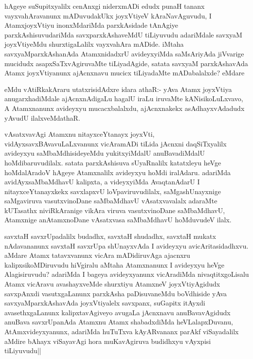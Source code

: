 \begin{artha}
hAgeye suSupitxyalilx cenAnxgi niderxmADi edudx punaH tananx vayxvahAravanunx mADuvudakUkx joyxVtiyeV kAraNavAguvudu, I AtamxjoyxVtiyu inonxMdariMda parxkAsidade tAnAgiye parxkAshisuvudariMda savxparxkAshaveMdU tiLiyuvudu adariMdale savxyaM joyxVtiyeMdu shurxtigaLalilx vayxvahAra mADide. iMtaha savxyaMparxkAshanAda AtamxnidadxrU avideyxyiMda saMsAriyAda jiVvarige mucidudx asapxSaTxvAgiruvaMte tiLiyadAgide, satata savxyaM parxkAshavAda Atamx joyxVtiyanunx ajAcnxnavu mucicx tiLiyadaMte mADabalalxde? eMdare  \stext 

eMdu vAtiRkakAraru utatxrisidAdxre idara athaR:- yAva Atamx joyxVtiya anugarxhadiMdale ajAcnxnAdigaLu hagalU iraLu iruvaMte kANisikoLuLxvavo, A Atamxnanunx avideyxyu mucacxbalalxdu, ajAcnxnakekx asAdhayxvAdadudx yAvudU ilalxveMdathaR.
\end{artha}


\begin{artha}
vAsatxvavAgi Atamxnu nitayxceYtanayx joyxVti, vidAyxsavxBAvavuLaLxvanunx vicAramADi tiLida jAcnxni daqSiTxyalilx avideyxyu saMbaMdhisideyeMdu yukitxyiMdalU anuBavadiMdalU hoMdibaruvudilalx. satata parxkAshisuva sUyaRnalilx katatxleyu heVge hoMdalAradoV hAgeye Atamxnalilx avideyxyu hoMdi iralAdaru. adariMda avidAyxsaMbaMdhavU kalipxta, a videyxyiMda AvaqtanAdarU I nitayxceYtanayxkekx savxlapxvU loVpaviruvudilalx, saMgashUnayxnige saMgaviruva vasutxvinoDane saMbaMdhavU vAsatxvavalalx adaraMte kUTasathx niviRkAranige vikAra viruva vasutxvinoDane saMbaMdhavU, Atamxnige anAtamxnoDane vAsatxvasa saMbaMdhavU hoMduvudeV ilalx. 	
\end{artha}

\begin{artha}
savxtaH savxrUpadalilx budadhx, savxtaH shudadhx, savxtaH  mukatx nAdavananunx savxtaH savxrUpa shUnayxvAda I avideyxyu avicAritasidadhxvu. aMdare Atamx tatavxvanunx vicAra mADidiruvAga ajacnxru kalipxsikoMDiruvudu hiVgiralu aMtaha Atamxnanunx I avideyxyu heVge Alagisiruvudu? adariMda I bageya avideyxyanunx vicAradiMda nivaqtitxgoLisalu Atamx vicAravu avashayxveMde shurxtiyu AtamxneV joyxVtiyAgidudx savxpAnxdi vasutxgaLanunx parxkAsha paDisuvaneMdu boVdhiside yAva savxyaMparxkAshavAda joyxVtiyalelx savxpanx, suGapitx itAyxdi avasethxgaLanunx kalipxtavAgiveyo avugaLa jAcnxnavu anuBavavAgidudx anuBava savxrUpanAda Atamxnu Atamx shabadxdiMda heVLalapxDuvanu, AtAmxvideyxyanunx, adariMda huTuTxva kAyARvananx parAkf viSayadalilx aMdire bAhayx viSayavAgi hora muKavAgiruva budidhxyu vAyxpisi tiLiyuvudu||
\end{artha}

